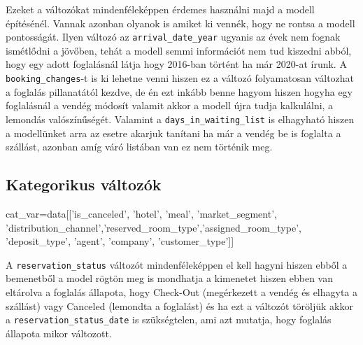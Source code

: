 Ezeket a változókat mindenféleképpen érdemes használni majd a modell építésénél. Vannak azonban olyanok is amiket ki vennék, hogy ne rontsa a modell pontosságát. Ilyen változó az \texttt{arrival\_date\_year} ugyanis az évek nem fognak ismétlődni a jövőben, tehát a modell semmi információt nem tud kiszedni abból, hogy egy adott foglalásnál látja hogy 2016-ban történt ha már 2020-at írunk. A \texttt{booking\_changes}-t is ki lehetne venni hiszen ez a változó folyamatosan változhat a foglalás pillanatától kezdve, de én ezt inkább benne hagyom hiszen hogyha egy foglalásnál a vendég módosít valamit akkor a modell újra tudja kalkulálni, a lemondás valószínűségét. Valamint a \texttt{days\_in\_waiting\_list} is elhagyható hiszen a modellünket arra az esetre akarjuk tanítani ha már a vendég be is foglalta a szállást, azonban amíg váró listában van ez nem történik meg.

\subsection{Kategorikus változók}

\begin{python}
cat_var=data[['is_canceled', 'hotel', 'meal', 'market_segment',
       'distribution_channel','reserved_room_type','assigned_room_type',
       'deposit_type', 'agent', 'company', 'customer_type']]
\end{python}


A \texttt{reservation\_status} változót mindenféleképpen el kell hagyni hiszen ebből a bemenetből a model rögtön meg is mondhatja a kimenetet hiszen ebben van eltárolva a foglalás állapota, hogy Check-Out (megérkezett a vendég és elhagyta a szállást) vagy Canceled (lemondta a foglalást) és ha ezt a változót töröljük akkor a \texttt{reservation\_status\_date} is szükségtelen, ami azt mutatja, hogy foglalás állapota mikor változott.

